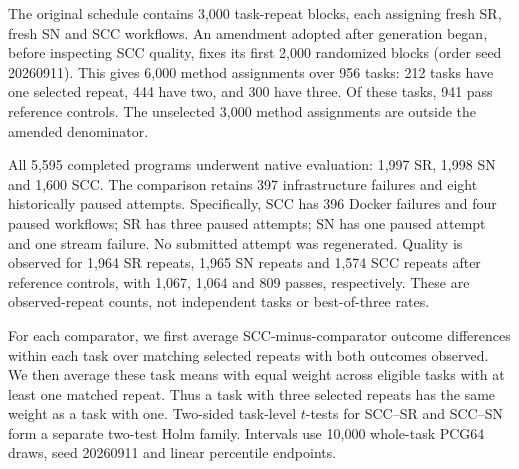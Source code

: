 \documentclass[pdflatex,sn-nature]{scientificreports}
\begin{document}
The original schedule contains 3,000 task-repeat blocks, each assigning fresh SR, fresh SN and SCC workflows. An amendment adopted after generation began, before inspecting SCC quality, fixes its first 2,000 randomized blocks (order seed 20260911). This gives 6,000 method assignments over 956 tasks: 212 tasks have one selected repeat, 444 have two, and 300 have three. Of these tasks, 941 pass reference controls. The unselected 3,000 method assignments are outside the amended denominator.

All 5,595 completed programs underwent native evaluation: 1,997 SR, 1,998 SN and 1,600 SCC. The comparison retains 397 infrastructure failures and eight historically paused attempts. Specifically, SCC has 396 Docker failures and four paused workflows; SR has three paused attempts; SN has one paused attempt and one stream failure. No submitted attempt was regenerated. Quality is observed for 1,964 SR repeats, 1,965 SN repeats and 1,574 SCC repeats after reference controls, with 1,067, 1,064 and 809 passes, respectively. These are observed-repeat counts, not independent tasks or best-of-three rates.

For each comparator, we first average SCC-minus-comparator outcome differences within each task over matching selected repeats with both outcomes observed. We then average these task means with equal weight across eligible tasks with at least one matched repeat. Thus a task with three selected repeats has the same weight as a task with one. Two-sided task-level $t$-tests for SCC--SR and SCC--SN form a separate two-test Holm family. Intervals use 10,000 whole-task PCG64 draws, seed 20260911 and linear percentile endpoints.
\end{document}
